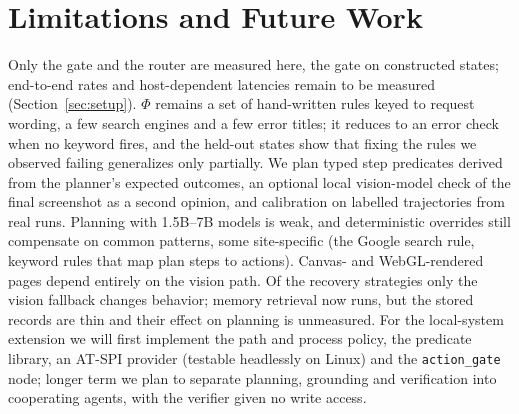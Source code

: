 \section{Limitations and Future Work}
\label{sec:limits}

Only the gate and the router are measured here, the gate on constructed states; end-to-end rates and host-dependent latencies remain to be measured (Section~\ref{sec:setup}). $\Phi$ remains a set of hand-written rules keyed to request wording, a few search engines and a few error titles; it reduces to an error check when no keyword fires, and the held-out states show that fixing the rules we observed failing generalizes only partially. We plan typed step predicates derived from the planner's expected outcomes, an optional local vision-model check of the final screenshot as a second opinion, and calibration on labelled trajectories from real runs. Planning with 1.5B--7B models is weak, and deterministic overrides still compensate on common patterns, some site-specific (the Google search rule, keyword rules that map plan steps to actions). Canvas- and WebGL-rendered pages depend entirely on the vision path. Of the recovery strategies only the vision fallback changes behavior; memory retrieval now runs, but the stored records are thin and their effect on planning is unmeasured. For the local-system extension we will first implement the path and process policy, the predicate library, an AT-SPI provider (testable headlessly on Linux) and the \texttt{action\_gate} node; longer term we plan to separate planning, grounding and verification into cooperating agents, with the verifier given no write access.
